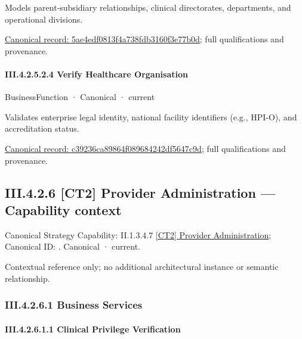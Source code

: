 Models parent-subsidiary relationships, clinical directorates, departments, and operational divisions.


{\footnotesize \href{../../../../continuum/business/business-function/5ae4edf0813f4a738fdb3160f3e77b0d.md}{Canonical record: 5ae4edf0813f4a738fdb3160f3e77b0d}; full qualifications and provenance.}\par
\paragraph*{III.4.2.5.2.4 Verify Healthcare Organisation}
\label{navigation:III.4.2.5.2.4}

\label{element:c39236ca89864f089684242df5647c9d}
{\small BusinessFunction · Canonical · current}\par

Validates enterprise legal identity, national facility identifiers (e.g., HPI-O), and accreditation status.


{\footnotesize \href{../../../../continuum/business/business-function/c39236ca89864f089684242df5647c9d.md}{Canonical record: c39236ca89864f089684242df5647c9d}; full qualifications and provenance.}\par
\subsection*{III.4.2.6 [CT2] Provider Administration — Capability context}
\label{navigation:III.4.2.6}

{\small Canonical Strategy Capability: II.1.3.4.7 \hyperref[element:d6312f85968a4209bafff5ed009297a6]{[CT2] Provider Administration}; Canonical ID: \texttt{}. Canonical · current.}\par
Contextual reference only; no additional architectural instance or semantic relationship.\par
\subsubsection*{III.4.2.6.1 Business Services}
\label{navigation:III.4.2.6.1}

\paragraph*{III.4.2.6.1.1 Clinical Privilege Verification}
\label{navigation:III.4.2.6.1.1}

